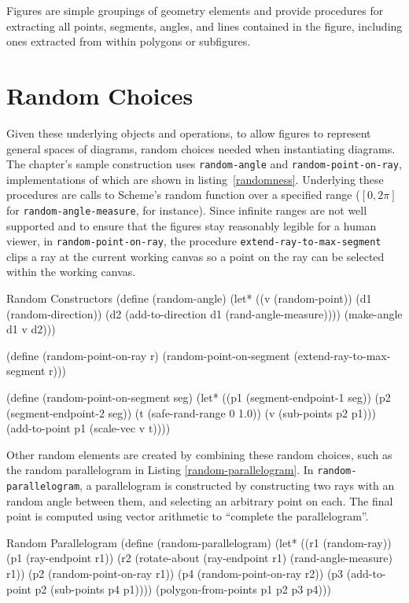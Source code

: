 Figures are simple groupings of geometry elements and provide
procedures for extracting all points, segments, angles,
and lines contained in the figure, including ones extracted from within
polygons or subfigures.

\section{Random Choices}

Given these underlying objects and operations, to allow figures to
represent general spaces of diagrams, random choices needed when
instantiating diagrams. The chapter's sample construction uses
\texttt{random-angle} and \texttt{random-point-on-ray},
implementations of which are shown in
listing~\ref{randomness}. Underlying these procedures are calls to
Scheme's random function over a specified range ($[0, 2\pi]$ for
\texttt{random-angle-measure}, for instance). Since infinite ranges
are not well supported and to ensure that the figures stay reasonably
legible for a human viewer, in \texttt{random-point-on-ray}, the
procedure \texttt{extend-ray-to-max-segment} clips a ray at the
current working canvas so a point on the ray can be selected within
the working canvas.

\enlargethispage*{0.5\baselineskip}

\begin{code-listing}
[label=randomness]
{Random Constructors}
(define (random-angle)
  (let* ((v (random-point))
         (d1 (random-direction))
         (d2 (add-to-direction d1 (rand-angle-measure))))
    (make-angle d1 v d2)))

(define (random-point-on-ray r)
  (random-point-on-segment
   (extend-ray-to-max-segment r)))

(define (random-point-on-segment seg)
  (let* ((p1 (segment-endpoint-1 seg))
         (p2 (segment-endpoint-2 seg))
         (t (safe-rand-range 0 1.0))
         (v (sub-points p2 p1)))
    (add-to-point p1 (scale-vec v t))))
\end{code-listing}
Other random elements are created by combining these random choices,
such as the random parallelogram in Listing
\ref{random-parallelogram}.  In \texttt{random-parallelogram}, a
parallelogram is constructed by constructing two rays with an random
angle between them, and selecting an arbitrary point on each. The
final point is computed using vector arithmetic to ``complete the
parallelogram''.

\begin{code-listing}
[label=random-parallelogram]
{Random Parallelogram}
(define (random-parallelogram)
  (let* ((r1 (random-ray))
         (p1 (ray-endpoint r1))
         (r2 (rotate-about (ray-endpoint r1) (rand-angle-measure) r1))
         (p2 (random-point-on-ray r1))
         (p4 (random-point-on-ray r2))
         (p3 (add-to-point p2 (sub-points p4 p1))))
    (polygon-from-points p1 p2 p3 p4)))
\end{code-listing}

